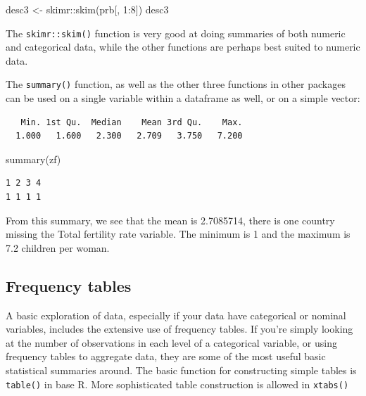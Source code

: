 \documentclass[
  letterpaper,
  DIV=11,
  numbers=noendperiod]{scrreprt}
\newenvironment{Shaded}{\begin{snugshade}}{\end{snugshade}}
\newcommand{\DecValTok}[1]{\textcolor[rgb]{0.68,0.00,0.00}{#1}}
\newcommand{\FunctionTok}[1]{\textcolor[rgb]{0.28,0.35,0.67}{#1}}
\newcommand{\NormalTok}[1]{\textcolor[rgb]{0.00,0.23,0.31}{#1}}
\newcommand{\OtherTok}[1]{\textcolor[rgb]{0.00,0.23,0.31}{#1}}
\newcommand{\SpecialCharTok}[1]{\textcolor[rgb]{0.37,0.37,0.37}{#1}}
\begin{document}
\begin{Shaded}
\begin{Highlighting}[]
\NormalTok{desc3 }\OtherTok{\textless{}{-}}\NormalTok{ skimr}\SpecialCharTok{::}\FunctionTok{skim}\NormalTok{(prb[, }\DecValTok{1}\SpecialCharTok{:}\DecValTok{8}\NormalTok{])}
\NormalTok{desc3}
\end{Highlighting}
\end{Shaded}

The \texttt{skimr::skim()} function is very good at doing summaries of
both numeric and categorical data, while the other functions are perhaps
best suited to numeric data.

The \texttt{summary()} function, as well as the other three functions in
other packages can be used on a single variable within a dataframe as
well, or on a simple vector:

\begin{Shaded}
\end{Shaded}

\begin{verbatim}
   Min. 1st Qu.  Median    Mean 3rd Qu.    Max. 
  1.000   1.600   2.300   2.709   3.750   7.200 
\end{verbatim}

\begin{Shaded}
\begin{Highlighting}[]
\FunctionTok{summary}\NormalTok{(zf)}
\end{Highlighting}
\end{Shaded}

\begin{verbatim}
1 2 3 4 
1 1 1 1 
\end{verbatim}

From this summary, we see that the mean is 2.7085714, there is one
country missing the Total fertility rate variable. The minimum is 1 and
the maximum is 7.2 children per woman.

\hypertarget{frequency-tables}{%
\subsection{Frequency tables}\label{frequency-tables}}

A basic exploration of data, especially if your data have categorical or
nominal variables, includes the extensive use of frequency tables. If
you're simply looking at the number of observations in each level of a
categorical variable, or using frequency tables to aggregate data, they
are some of the most useful basic statistical summaries around. The
basic function for constructing simple tables is \texttt{table()} in
base R. More sophisticated table construction is allowed in
\texttt{xtabs()}
\end{document}
